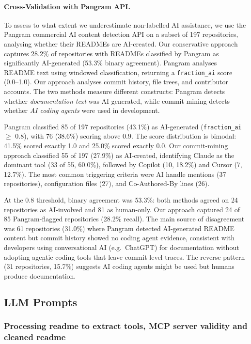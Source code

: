 \documentclass[manuscript,screen,nonacm,oneside]{acmart}
\begin{document}
\paragraph{Cross-Validation with Pangram API.}
To assess to what extent we underestimate non-labelled AI assistance, we use the Pangram commercial AI content detection API on a subset of 197 repositories, analysing whether their READMEs are AI-created. Our conservative approach captures 28.2\% of repositories with READMEs classified by Pangram as significantly AI-generated (53.3\% binary agreement). Pangram analyses README text using
windowed classification, returning a \texttt{fraction\_ai} score (0.0--1.0). Our approach
analyses commit history, file trees, and contributor accounts. The two methods measure
different constructs: Pangram detects whether \emph{documentation text} was AI-generated,
while commit mining detects whether \emph{AI coding agents} were used in development.

Pangram classified 85 of 197 repositories (43.1\%) as AI-generated (\texttt{fraction\_ai} $\geq$ 0.8), with 76 (38.6\%) scoring above 0.9. The score distribution is bimodal: 41.5\% scored exactly 1.0 and 25.0\% scored exactly 0.0. Our commit-mining approach classified 55 of 197 (27.9\%) as AI-created, identifying Claude as the dominant tool (33 of 55, 60.0\%), followed by Copilot (10, 18.2\%) and Cursor (7, 12.7\%). The most common triggering criteria were AI handle mentions
(37 repositories), configuration files (27), and Co-Authored-By lines (26).

At the 0.8 threshold, binary agreement was 53.3\%: both methods agreed on 24 repositories as AI-involved and 81 as human-only. Our approach captured 24 of 85  Pangram-flagged repositories (28.2\% recall). The main source of disagreement was 61 repositories (31.0\%) where Pangram detected AI-generated README content but commit history showed no coding agent evidence, consistent with developers using conversational
AI (e.g.\ ChatGPT) for documentation without adopting agentic coding tools that leave commit-level traces. The reverse pattern (31 repositories, 15.7\%) suggests AI coding agents might be used but humans produce documentation.

\subsection{LLM Prompts}
\label{app:prompts}

\subsubsection{Processing readme to extract tools, MCP server validity and cleaned readme}
\end{document}
